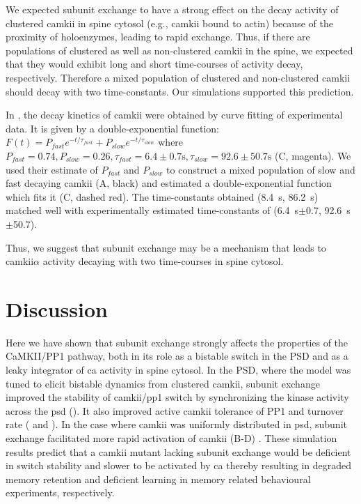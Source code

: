 \documentclass[9pt,lineno,doublespacing]{elife}
\begin{document}
We expected subunit exchange to have a strong effect on the decay activity of
clustered \gls{camkii} in spine cytosol (e.g., \gls{camkii} bound to actin)
because of the proximity of holoenzymes, leading to rapid exchange.  Thus, if
there are populations of clustered as well as non-clustered \gls{camkii} in the
spine, we expected that they would exhibit long and short time-courses of
activity decay, respectively.  Therefore a mixed population of clustered and
non-clustered \gls{camkii} should decay with two time-constants.  Our
simulations supported this prediction. 

In \cite{chang_camkii_2017}, the decay kinetics of \gls{camkii} were obtained by
curve fitting of experimental data. It is given by a double-exponential
function: $F(t)=P_{fast}e^{-t/\tau_{fast}}+P_{slow}e^{-t/\tau_{slow}}$ where
$P_{fast}=0.74, P_{slow}=0.26,  \tau_{fast}= 6.4\pm0.7 \si{\second},
\tau_{slow}=92.6 \pm 50.7\si{\second}$ (C, magenta).  We
used their estimate of $P_{fast}$ and $P_{slow}$ to construct a mixed population
of slow and fast decaying \gls{camkii} (A, black) and
estimated a double-exponential function which fits it
(C, dashed red). The time-constants obtained
(\SI{8.4}{\second}, \SI{86.2}{\second}) matched well with experimentally
estimated time-constants of (\SI{6.4}{\second}$\pm$0.7,
\SI{92.6}{\second}$\pm$50.7). 

Thus, we suggest that subunit exchange may be a mechanism that leads to
\gls{camkii}$\alpha$ activity decaying with two time-courses in spine 
cytosol.

\section{Discussion}\label{discussion}

Here we have shown that subunit exchange strongly affects the properties of the
CaMKII/PP1 pathway, both in its role as a bistable switch in the PSD and as a
leaky integrator of \gls{ca} activity in spine cytosol. In the PSD, where the
model was tuned to elicit bistable dynamics from clustered \gls{camkii}, subunit
exchange improved the stability of \gls{camkii}/\gls{pp1} switch by
synchronizing the kinase activity across the \gls{psd}
().  It also improved active \gls{camkii} tolerance of
PP1 and turnover rate ( and ). In the case
where \gls{camkii} was uniformly distributed in \gls{psd}, subunit exchange
facilitated more rapid activation of \gls{camkii}
(B-D)
\citep{stratton_activation-triggered_2014}. These simulation results predict
that a \gls{camkii} mutant lacking subunit exchange would be deficient in switch
stability and slower to be activated by \gls{ca} thereby resulting in degraded
memory retention and deficient learning in memory related behavioural
experiments, respectively.
\end{document}
